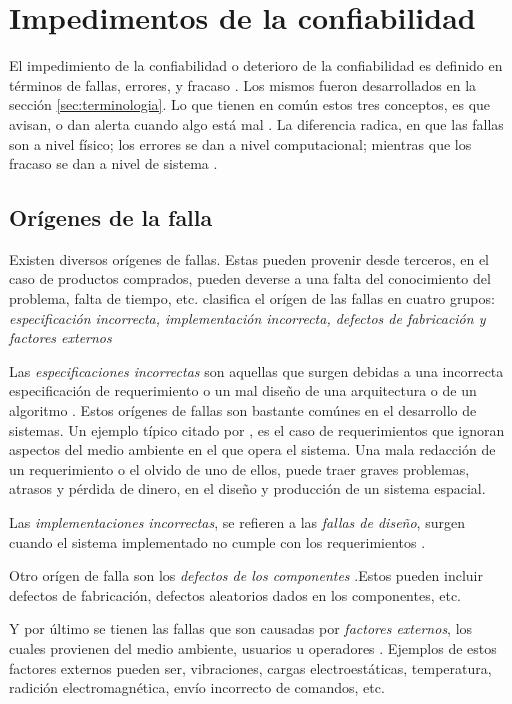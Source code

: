 \section{Impedimentos de la confiabilidad}
El impedimiento de la confiabilidad o deterioro de la confiabilidad es definido en términos de
fallas, errores, y fracaso \citep{FTDesign}. Los mismos fueron desarrollados en la sección
\ref{sec:terminologia}. Lo que tienen en común estos tres conceptos, es que avisan, o dan alerta
cuando algo está mal \citep{FTDesign}. La diferencia radica, en que las fallas son a nivel físico;
los errores se dan a nivel computacional; mientras que los fracaso se dan a nivel de sistema
\cite{FTDesign}.

\subsection{Orígenes de la falla}
Existen diversos orígenes de fallas. Estas pueden provenir desde terceros, en el caso de productos
comprados, pueden deverse a una falta del conocimiento del problema, falta de tiempo, etc.
\cite{FTDesign} clasifica el orígen de las fallas en cuatro grupos: \textit{especificación
incorrecta, implementación incorrecta, defectos de fabricación y factores externos}

Las \textit{especificaciones incorrectas} son aquellas que surgen debidas a una incorrecta
especificación de requerimiento o un mal diseño de una arquitectura o de un algoritmo
\citep{FTDesign}. Estos orígenes de fallas son bastante comúnes en el desarrollo de sistemas. Un
ejemplo típico citado por \cite{FTDesign}, es el caso de requerimientos que ignoran aspectos del
medio ambiente en el que opera el sistema. Una mala redacción de un requerimiento o el olvido de
uno de ellos, puede traer graves problemas, atrasos y pérdida de dinero,  en el diseño y producción
de un sistema espacial.

Las \textit{implementaciones incorrectas}, se refieren a las \textit{fallas de diseño}, surgen
cuando el sistema implementado no cumple con los requerimientos \citep{FTDesign}.

Otro orígen de falla son los \textit{defectos de los componentes} \citep{FTDesign}.Estos pueden
incluir defectos de fabricación, defectos aleatorios dados en los componentes, etc.

Y por último se tienen las fallas que son causadas por \textit{factores externos}, los cuales
provienen del medio ambiente, usuarios u operadores \citep{FTDesign}. Ejemplos de estos factores
externos pueden ser, vibraciones, cargas electroestáticas, temperatura, radición electromagnética,
envío incorrecto de comandos, etc.

